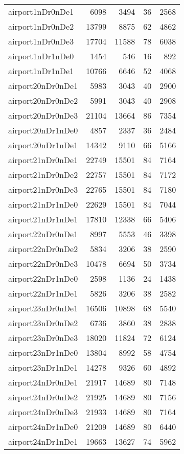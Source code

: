 \begin{longtable}{lrrrr}
airport1nDr0nDe1 & 6098 & 3494 & 36 & 2568 \\
airport1nDr0nDe2 & 13799 & 8875 & 62 & 4862 \\
airport1nDr0nDe3 & 17704 & 11588 & 78 & 6038 \\
airport1nDr1nDe0 & 1454 & 546 & 16 & 892 \\
airport1nDr1nDe1 & 10766 & 6646 & 52 & 4068 \\
airport20nDr0nDe1 & 5983 & 3043 & 40 & 2900 \\
airport20nDr0nDe2 & 5991 & 3043 & 40 & 2908 \\
airport20nDr0nDe3 & 21104 & 13664 & 86 & 7354 \\
airport20nDr1nDe0 & 4857 & 2337 & 36 & 2484 \\
airport20nDr1nDe1 & 14342 & 9110 & 66 & 5166 \\
airport21nDr0nDe1 & 22749 & 15501 & 84 & 7164 \\
airport21nDr0nDe2 & 22757 & 15501 & 84 & 7172 \\
airport21nDr0nDe3 & 22765 & 15501 & 84 & 7180 \\
airport21nDr1nDe0 & 22629 & 15501 & 84 & 7044 \\
airport21nDr1nDe1 & 17810 & 12338 & 66 & 5406 \\
airport22nDr0nDe1 & 8997 & 5553 & 46 & 3398 \\
airport22nDr0nDe2 & 5834 & 3206 & 38 & 2590 \\
airport22nDr0nDe3 & 10478 & 6694 & 50 & 3734 \\
airport22nDr1nDe0 & 2598 & 1136 & 24 & 1438 \\
airport22nDr1nDe1 & 5826 & 3206 & 38 & 2582 \\
airport23nDr0nDe1 & 16506 & 10898 & 68 & 5540 \\
airport23nDr0nDe2 & 6736 & 3860 & 38 & 2838 \\
airport23nDr0nDe3 & 18020 & 11824 & 72 & 6124 \\
airport23nDr1nDe0 & 13804 & 8992 & 58 & 4754 \\
airport23nDr1nDe1 & 14278 & 9326 & 60 & 4892 \\
airport24nDr0nDe1 & 21917 & 14689 & 80 & 7148 \\
airport24nDr0nDe2 & 21925 & 14689 & 80 & 7156 \\
airport24nDr0nDe3 & 21933 & 14689 & 80 & 7164 \\
airport24nDr1nDe0 & 21209 & 14689 & 80 & 6440 \\
airport24nDr1nDe1 & 19663 & 13627 & 74 & 5962 \\

\end{longtable}
